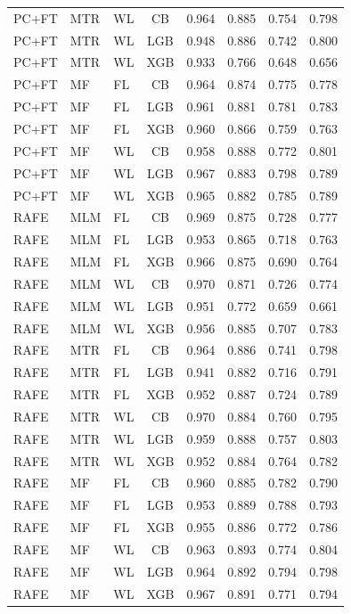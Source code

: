 \documentclass[9pt,a4paper]{article}
\begin{document}
\begin{scriptsize}
\begin{longtable}{lllcrrrr}
PC+FT & MTR & WL & CB  & 0.964 & 0.885 & 0.754 & 0.798 \\
PC+FT & MTR & WL & LGB & 0.948 & 0.886 & 0.742 & 0.800 \\
PC+FT & MTR & WL & XGB & 0.933 & 0.766 & 0.648 & 0.656 \\
PC+FT & MF  & FL & CB  & 0.964 & 0.874 & 0.775 & 0.778 \\
PC+FT & MF  & FL & LGB & 0.961 & 0.881 & 0.781 & 0.783 \\
PC+FT & MF  & FL & XGB & 0.960 & 0.866 & 0.759 & 0.763 \\
PC+FT & MF  & WL & CB  & 0.958 & 0.888 & 0.772 & 0.801 \\
PC+FT & MF  & WL & LGB & 0.967 & 0.883 & 0.798 & 0.789 \\
PC+FT & MF  & WL & XGB & 0.965 & 0.882 & 0.785 & 0.789 \\
\midrule
RAFE & MLM & FL & CB  & 0.969 & 0.875 & 0.728 & 0.777 \\
RAFE & MLM & FL & LGB & 0.953 & 0.865 & 0.718 & 0.763 \\
RAFE & MLM & FL & XGB & 0.966 & 0.875 & 0.690 & 0.764 \\
RAFE & MLM & WL & CB  & 0.970 & 0.871 & 0.726 & 0.774 \\
RAFE & MLM & WL & LGB & 0.951 & 0.772 & 0.659 & 0.661 \\
RAFE & MLM & WL & XGB & 0.956 & 0.885 & 0.707 & 0.783 \\
RAFE & MTR & FL & CB  & 0.964 & 0.886 & 0.741 & 0.798 \\
RAFE & MTR & FL & LGB & 0.941 & 0.882 & 0.716 & 0.791 \\
RAFE & MTR & FL & XGB & 0.952 & 0.887 & 0.724 & 0.789 \\
RAFE & MTR & WL & CB  & 0.970 & 0.884 & 0.760 & 0.795 \\
RAFE & MTR & WL & LGB & 0.959 & 0.888 & 0.757 & 0.803 \\
RAFE & MTR & WL & XGB & 0.952 & 0.884 & 0.764 & 0.782 \\
RAFE & MF  & FL & CB  & 0.960 & 0.885 & 0.782 & 0.790 \\
RAFE & MF  & FL & LGB & 0.953 & 0.889 & 0.788 & 0.793 \\
RAFE & MF  & FL & XGB & 0.955 & 0.886 & 0.772 & 0.786 \\
RAFE & MF  & WL & CB  & 0.963 & 0.893 & 0.774 & 0.804 \\
RAFE & MF  & WL & LGB & 0.964 & 0.892 & 0.794 & 0.798 \\
RAFE & MF  & WL & XGB & 0.967 & 0.891 & 0.771 & 0.794 \\

\end{longtable}
\end{scriptsize}
\end{document}
